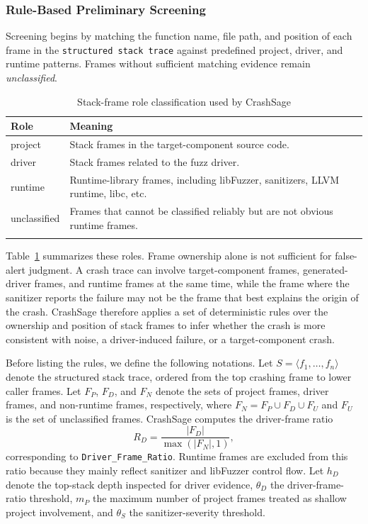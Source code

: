 \documentclass[pdflatex,sn-basic]{sn-jnl}%
\renewcommand{\arraystretch}{1.16}%
\theoremstyle{thmstyleone}%
\theoremstyle{thmstyletwo}%
\theoremstyle{thmstylethree}%
\begin{document}
\subsubsection{Rule-Based Preliminary Screening}
Screening begins by matching the function name, file path, and position of each frame in the \texttt{structured stack trace} against predefined project, driver, and runtime patterns.
Frames without sufficient matching evidence remain \emph{unclassified}.

\begin{table}[!htbp]
\caption{Stack-frame role classification used by CrashSage}
\label{tab:stack-frame-roles}
\centering
\scriptsize
\setlength{\tabcolsep}{4.0pt}
\renewcommand{\arraystretch}{1.10}
\begin{tabular*}{\linewidth}{@{\extracolsep{\fill}}ll}
\toprule
\textbf{Role} & \textbf{Meaning} \\
\midrule
project & Stack frames in the target-component source code. \\
driver & Stack frames related to the fuzz driver. \\
runtime & Runtime-library frames, including libFuzzer, sanitizers, LLVM runtime, libc, etc. \\
unclassified & Frames that cannot be classified reliably but are not obvious runtime frames. \\
\botrule
\end{tabular*}
\end{table}
\FloatBarrier

Table~\ref{tab:stack-frame-roles} summarizes these roles. Frame ownership alone is not sufficient for false-alert judgment.
A crash trace can involve target-component frames, generated-driver frames, and runtime frames at the same time, while the frame where the sanitizer reports the failure may not be the frame that best explains the origin of the crash.
CrashSage therefore applies a set of deterministic rules over the ownership and position of stack frames to infer whether the crash is more consistent with noise, a driver-induced failure, or a target-component crash.

Before listing the rules, we define the following notations.
Let \(S=\langle f_1,\ldots,f_n\rangle\) denote the structured stack trace, ordered from the top crashing frame to lower caller frames.
Let \(F_P\), \(F_D\), and \(F_N\) denote the sets of project frames, driver frames, and non-runtime frames, respectively, where \(F_N=F_P\cup F_D\cup F_U\) and \(F_U\) is the set of unclassified frames.
CrashSage computes the driver-frame ratio
\begin{equation*}
R_D=\frac{|F_D|}{\max(|F_N|,1)} ,
\end{equation*}
corresponding to \texttt{Driver\_Frame\_Ratio}.
Runtime frames are excluded from this ratio because they mainly reflect sanitizer and libFuzzer control flow.
Let \(h_D\) denote the top-stack depth inspected for driver evidence, \(\theta_D\) the driver-frame-ratio threshold, \(m_P\) the maximum number of project frames treated as shallow project involvement, and \(\theta_S\) the sanitizer-severity threshold.
\end{document}
